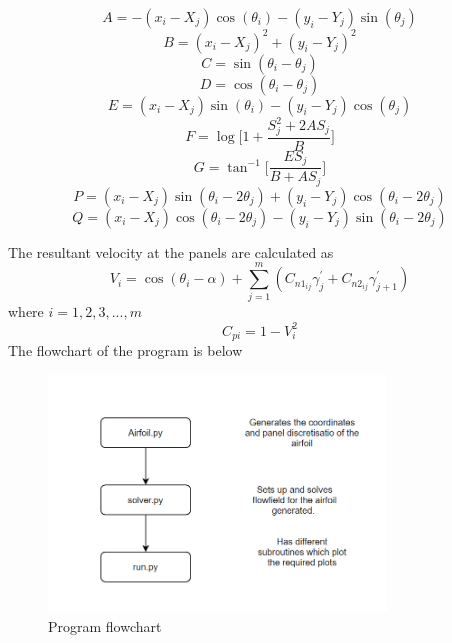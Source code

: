 \documentclass[main.tex]{subfiles}
\begin{document}
\begin{equation}
  A = - (x_i - X_j)\cos({\theta_i}) - (y_i - Y_j)\sin({\theta_j})
\end{equation}
\begin{equation}
  B = (x_i - X_j)^2 + (y_i - Y_j)^2
\end{equation}
\begin{equation}
  C = \sin({\theta_i - \theta_j})
\end{equation}
\begin{equation}
  D = \cos({\theta_i - \theta_j})
\end{equation}
\begin{equation}
   E = (x_i - X_j)\sin({\theta_i}) - (y_i - Y_j)\cos({\theta_j})
\end{equation}
\begin{equation}
   F = \log\bigg[ 1 + \frac{S^{2}_j + 2AS_j}{B}\bigg]
\end{equation}
\begin{equation}
   G = \tan^{-1}\bigg[ \frac{ES_j}{B + AS_j}\bigg]
\end{equation}
\begin{equation}
   P = (x_i - X_j)\sin({\theta_i} - 2{\theta_j}) + (y_i - Y_j)\cos({\theta_i} - 2{\theta_j})
\end{equation}
\begin{equation}
   Q = (x_i - X_j)\cos({\theta_i} - 2{\theta_j}) - (y_i - Y_j)\sin({\theta_i} - 2{\theta_j})
\end{equation}

The resultant velocity at the panels are calculated as 
\begin{equation}
   V_i = \cos({\theta_i} - \alpha) + \sum_{j=1}^{m} (C_{n1_{ij}}\gamma^{'}_{j} + C_{n2_{ij}}\gamma^{'}_{j+1})
\end{equation}
where $ i = 1, 2, 3, ..., m $
\begin{equation}
   C_{pi} = 1 - V_{i}^{2}
\end{equation}
The flowchart of the program is below
\begin{figure}[h!]
\vspace*{-0.5em}\centering
\includegraphics[width=0.8\textwidth]{./Images/Assingment1/flowchart.png}
\caption{Program flowchart}\vspace*{-0.5em}
\label{fig3}

\end{figure}\vspace*{-1.0em}
\end{document}
